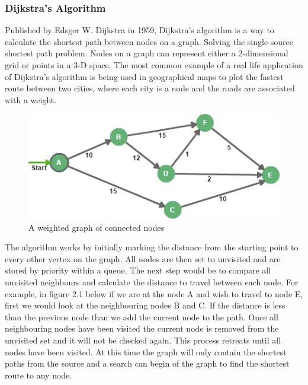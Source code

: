 \documentclass[12pt,a4paper,oneside]{book}
\begin{document}
\subsubsection{Dijkstra’s Algorithm}
Published by Edsger W. Dijkstra in 1959, Dijkstra’s algorithm is a way to calculate the shortest path between nodes on a graph. Solving the single-source shortest path problem. Nodes on a graph can represent either a 2-dimensional grid or points in a 3-D space. The most common example of a real life application of Dijkstra’s algorithm is being used in geographical maps to plot the fastest route between two cities, where each city is a node and the roads are associated with a weight. 
\vspace{2mm} 
\newline
\begin{figure}
	\includegraphics[width=\linewidth]{images/Dijsk.png}
	\caption{A weighted graph of connected nodes}
\end{figure}
The algorithm works by initially marking the distance from the starting point to every other vertex on the graph. All nodes are then set to unvisited and are stored  by priority within a queue. The next step would be to compare all unvisited neighbours and calculate the distance to travel between each node. For example, in figure 2.1 below if we are at the node A and wish to travel to node E, first we would look at the neighbouring nodes B and C. If the distance is less than the previous node than we add the current node to the path. Once all neighbouring nodes have been visited the current node is removed from the unvisited set and it will not be checked again. This process retreats until all nodes have been visited. At this time the graph will only contain the shortest paths from the source and a search can begin of the graph to find the shortest route to any node.
\end{document}
